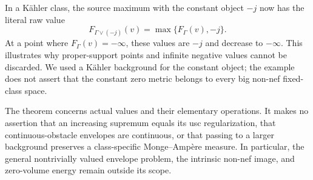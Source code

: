 In a K\"ahler class, the source maximum with the constant object
\(-j\) now has the literal raw value
\[
 F_{\Gamma\vee(-j)}(v)=\max\{F_\Gamma(v),-j\}.
\]
At a point where \(F_\Gamma(v)=-\infty\), these values are \(-j\)
and decrease to \(-\infty\). This illustrates why proper-support points
and infinite negative values cannot be discarded. We used a K\"ahler
background for the constant object; the example does not assert that the
constant zero metric belongs to every big non-nef fixed-class space.

The theorem concerns actual values and their elementary operations.
It makes no assertion that an increasing supremum equals its usc
regularization, that continuous-obstacle envelopes are continuous, or that
passing to a larger background preserves a class-specific Monge--Amp\`ere
measure. In particular, the general nontrivially valued envelope problem,
the intrinsic non-nef image, and zero-volume energy remain outside its scope.
